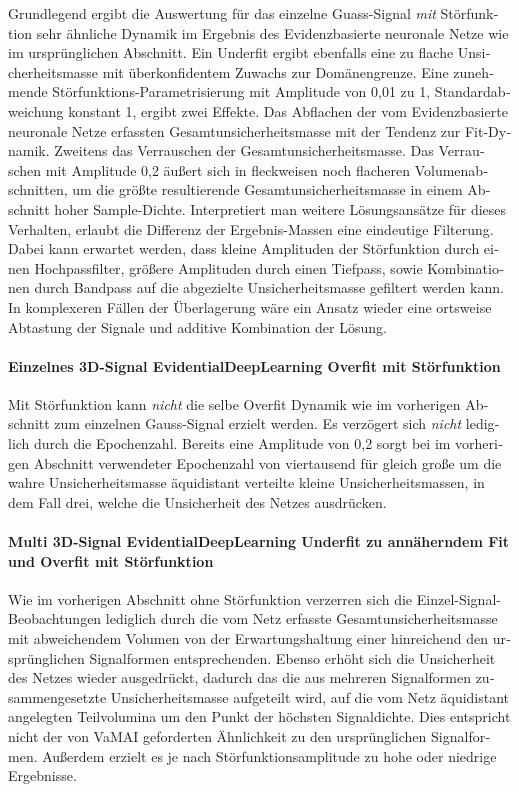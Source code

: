 \begin{otherlanguage}{ngerman}
Grundlegend ergibt die Auswertung für das einzelne Guass-Signal \textit{mit} Störfunktion sehr ähnliche Dynamik im Ergebnis des \gls{Evidenzbasierte neuronale Netze} wie im ursprünglichen Abschnitt. Ein Underfit ergibt ebenfalls eine zu flache Unsicherheitsmasse mit überkonfidentem Zuwachs zur Domänengrenze. Eine zunehmende Störfunktions-Parametrisierung mit Amplitude von 0,01 zu 1, Standardabweichung konstant 1, ergibt zwei Effekte. Das Abflachen der vom \gls{Evidenzbasierte neuronale Netze} erfassten Gesamtunsicherheitsmasse mit der Tendenz zur Fit-Dynamik. Zweitens das Verrauschen der Gesamtunsicherheitsmasse. Das Verrauschen mit Amplitude 0,2 äußert sich in fleckweisen noch flacheren Volumenabschnitten, um die größte resultierende Gesamtunsicherheitsmasse in einem Abschnitt hoher Sample-Dichte. Interpretiert man weitere Lösungsansätze für dieses Verhalten, erlaubt die Differenz der Ergebnis-Massen eine eindeutige Filterung. Dabei kann erwartet werden, dass kleine Amplituden der Störfunktion durch einen Hochpassfilter, größere Amplituden durch einen Tiefpass, sowie Kombinationen durch Bandpass auf die abgezielte Unsicherheitsmasse gefiltert werden kann. In komplexeren Fällen der Überlagerung wäre ein Ansatz wieder eine ortsweise Abtastung der Signale und additive Kombination der Lösung. 



\paragraph{Einzelnes 3D-Signal \gls{EvidentialDeepLearning} Overfit mit Störfunktion}

Mit Störfunktion kann \textit{nicht} die selbe Overfit Dynamik wie im vorherigen Abschnitt zum einzelnen Gauss-Signal erzielt werden. Es verzögert sich \textit{nicht} lediglich durch die Epochenzahl. Bereits eine Amplitude von 0,2 sorgt bei im vorherigen Abschnitt verwendeter Epochenzahl von viertausend für gleich große um die wahre Unsicherheitsmasse äquidistant verteilte kleine Unsicherheitsmassen, in dem Fall drei, welche die Unsicherheit des Netzes ausdrücken. 



\paragraph{Multi 3D-Signal \gls{EvidentialDeepLearning} Underfit zu annäherndem Fit und Overfit mit Störfunktion} 

Wie im vorherigen Abschnitt ohne Störfunktion verzerren sich die Einzel-Signal-Beobachtungen lediglich durch die vom Netz erfasste Gesamtunsicherheitsmasse mit abweichendem Volumen von der Erwartungshaltung einer hinreichend den ursprünglichen Signalformen entsprechenden. Ebenso erhöht sich die Unsicherheit des Netzes wieder ausgedrückt, dadurch das die aus mehreren Signalformen zusammengesetzte Unsicherheitsmasse aufgeteilt wird, auf die vom Netz äquidistant angelegten Teilvolumina um den Punkt der höchsten Signaldichte. Dies entspricht nicht der von VaMAI geforderten Ähnlichkeit zu den ursprünglichen Signalformen. Außerdem erzielt es je nach Störfunktionsamplitude zu hohe oder niedrige Ergebnisse. 




\end{otherlanguage}
